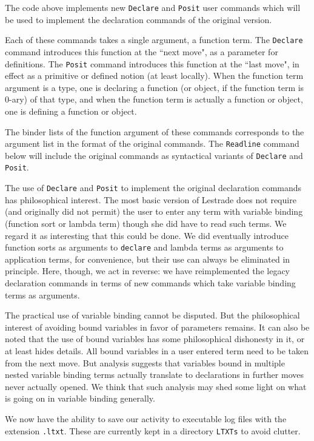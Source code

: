 \documentclass[12pt]{article}
\begin{document}
The code above implements new {\tt Declare} and {\tt Posit} user commands which will be used to implement the declaration commands of the original version.

Each of these commands takes a single argument, a function term.  The {\tt Declare} command introduces this function  at the ``next move", as a parameter for
definitions.  The {\tt Posit} command introduces this function at the ``last move", in effect as a primitive  or defined notion (at least locally).  When the function term
argument is a type, one is declaring a function (or object, if the function term is 0-ary) of that type, and when the function term is actually a function or object, one is defining
a function or object.

The binder lists of the function argument of these commands corresponds to the argument list in the format of the original commands.  The {\tt Readline} command below will include the original commands as syntactical variants of {\tt Declare} and {\tt Posit}.

The use of {\tt Declare} and {\tt Posit} to implement the original declaration commands has philosophical interest.  The most basic version of Lestrade
does not require (and originally did not permit) the user to enter any term with variable binding (function sort or lambda term) though she did have to read
such terms.  We regard it as interesting that this could be done.  We did eventually introduce function sorts as arguments to {\tt declare} and lambda terms
as arguments to application terms, for convenience, but their use can always be eliminated in principle.  Here, though, we act in reverse:  we have
reimplemented the legacy declaration commands in terms of new commands which take variable binding terms as arguments.

The practical use of variable binding cannot be disputed.  But the philosophical interest of avoiding bound variables in favor of parameters remains.
It can also be noted that the use of bound variables has some philosophical dishonesty in it, or at least hides details.  All bound variables in a user
entered term need to be taken from the next move.  But analysis suggests that variables bound in multiple nested variable binding terms actually translate
to declarations in further moves never actually opened.  We think that such analysis may shed some light on what is going on in variable binding generally.

We now have the ability to save our activity to executable log files with the extension {\tt .ltxt}.  These are currently kept in a directory {\tt LTXTs} to avoid clutter.
\end{document}
